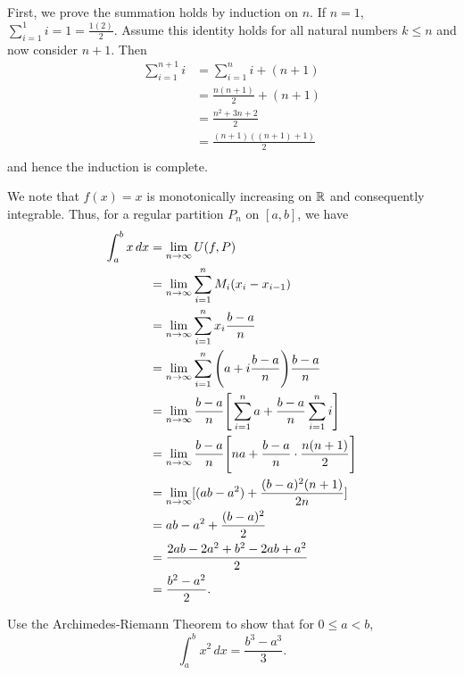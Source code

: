 \documentclass[letterpaper, twoside, 12pt]{book}
\begin{document}
\begin{solution}
    First, we prove the summation holds by induction on \(n\). If \(n = 1\),
    \(\sum_{i=1}^1 i = 1 = \frac{1(2)}{2}\). Assume this identity holds
    for all natural numbers \(k \leq n\) and now consider \(n + 1\). Then
    \begin{align*}
        \sum_{i=1}^{n+1} i &= \sum_{i = 1}^{n} i + (n + 1) \\
                        &= \frac{n(n+1)}{2} + (n + 1) \\
                        &= \frac{n^2 + 3n + 2}{2} \\
                        &= \frac{ (n+1)((n+1) + 1)}{2} \\
    \end{align*}
    and hence the induction is complete.

    We note that \(f(x) = x\) is monotonically increasing on \(\mathbb R\) and
    consequently integrable. Thus, for a regular partition \(P_n\) on 
    \([a,b]\), we have
    \begin{align*}
        \int_a^b x\,dx &= \lim_{n \to \infty} U(f, P) \\
                       &= \lim_{n \to \infty} \sum_{i = 1}^n M_i (x_i - x_{i-1}) \\
                       &= \lim_{n \to \infty} \sum_{i = 1}^n x_i \frac{b - a}{n} \\
                       &= \lim_{n \to \infty} \sum_{i = 1}^n \Bigg (a + i \frac{b-a}{n} \Bigg ) \frac{b-a}{n} \\
                       &= \lim_{n \to \infty} \frac{b-a}{n} \Bigg [ \sum_{i = 1}^n a + \frac{b-a}{n} \sum_{i = 1}^n i \Bigg ] \\
                       &= \lim_{n \to \infty} \frac{b-a}{n} \Bigg [ na + \frac{b-a}{n} \cdot \frac{n(n+1)}{2} \Bigg ] \\
                       &= \lim_{n \to \infty} [(ab - a^2) + \frac{(b-a)^2 (n+1)}{2n}] \\
                       &= ab - a^2 + \frac{(b-a)^2}{2} \\
                       &= \frac{2ab - 2a^2 + b^2 - 2ab + a^2}{2} \\
                       &= \frac{b^2 - a^2}{2} .\\
    \end{align*}
\end{solution}


\begin{exercise}[6b]
  Use the Archimedes-Riemann Theorem to show that for \(0\leq a<b\),
  \[
    \int_a^b x^2\,dx = \frac{b^3-a^3}{3}
  .\]
\end{exercise}
\end{document}
